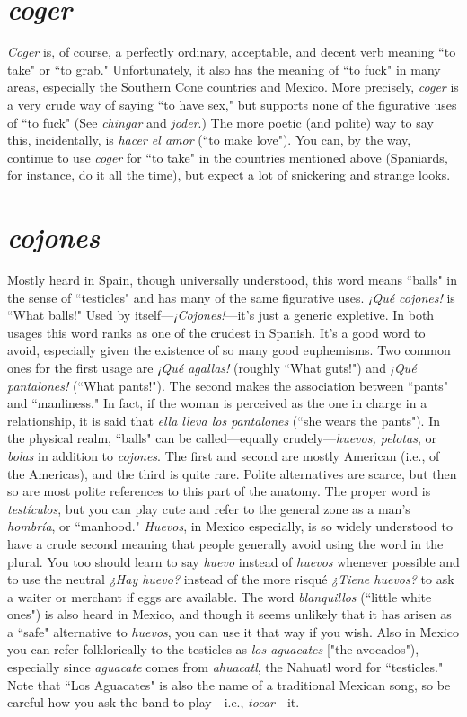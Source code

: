 \section{\emph{coger}}

\emph{Coger} is, of course, a perfectly ordinary, acceptable, and decent
verb meaning ``to take" or ``to grab." Unfortunately, it also has the
meaning of ``to fuck" in many areas, especially the Southern Cone
countries and Mexico. More precisely, \emph{coger} is a very crude way of saying ``to have sex," but supports none of the figurative uses of ``to fuck"
(See \emph{chingar} and \emph{joder}.) The more poetic (and polite) way to say this,
incidentally, is \emph{hacer el amor} (``to make love"). You can, by the way,
continue to use \emph{coger} for ``to take" in the countries mentioned above
(Spaniards, for instance, do it all the time), but expect a lot of snickering and strange looks.

\section{\emph{cojones}}

Mostly heard in Spain, though universally understood, this
word means ``balls" in the sense of ``testicles" and has many of the
same figurative uses. \emph{¡Qué cojones!} is ``What balls!" Used by itself---\emph{¡Cojones!}---it's just a generic expletive. In both usages this word ranks
as one of the crudest in Spanish. It's a good word to avoid, especially
given the existence of so many good euphemisms. Two common ones
for the first usage are \emph{¡Qué agallas!} (roughly ``What guts!") and \emph{¡Qué
	pantalones!} (``What pants!"). The second makes the association between ``pants" and ``manliness." In fact, if the woman is perceived as
the one in charge in a relationship, it is said that \emph{ella lleva los pantalones} (``she wears the pants").
In the physical realm, ``balls" can be called---equally
crudely---\emph{huevos, pelotas}, or \emph{bolas} in addition to \emph{cojones}. The first
and second are mostly American (i.e., of the Americas), and the third is
quite rare. Polite alternatives are scarce, but then so are most polite
references to this part of the anatomy. The proper word is \emph{testículos},
but you can play cute and refer to the general zone as a man's \emph{hombría},
or ``manhood."
\emph{Huevos}, in Mexico especially, is so widely understood to have
a crude second meaning that people generally avoid using the word in
the plural. You too should learn to say \emph{huevo} instead of \emph{huevos} whenever possible and to use the neutral \emph{¿Hay huevo?} instead of the more
risqué \emph{¿Tiene huevos?} to ask a waiter or merchant if eggs are available.
The word \emph{blanquillos} (``little white ones") is also heard in Mexico, and
though it seems unlikely that it has arisen as a ``safe" alternative to
\emph{huevos}, you can use it that way if you wish. Also in Mexico you can
refer folklorically to the testicles as \emph{los aguacates} ["the avocados"),
especially since \emph{aguacate} comes from \emph{ahuacatl}, the Nahuatl word
for ``testicles." Note that ``Los Aguacates" is also the name of a traditional Mexican song, so be careful how you ask the band to play---i.e.,
\emph{tocar}---it.

